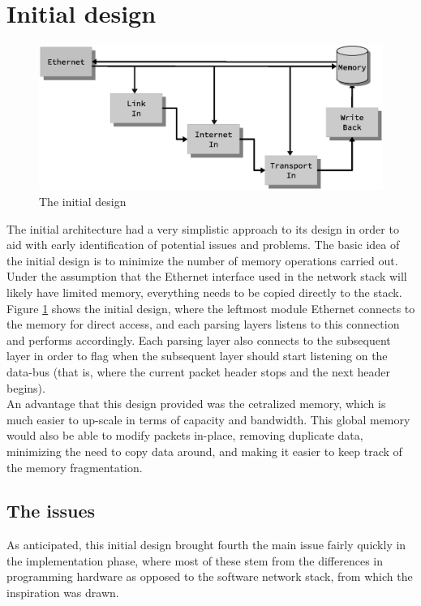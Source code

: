 \section{Initial design}

\begin{figure}
    \centering
    \includegraphics[scale=0.45]{design/design_0.eps}
    \caption{The initial design}
    \label{fig:initial_design}
\end{figure}

The initial architecture had a very simplistic approach to its design in order
to aid with early identification of potential issues and problems.
The basic idea of the initial design is to minimize the number of memory
operations carried out. Under the assumption that the Ethernet interface used in the network
stack will likely have limited memory, everything needs to be copied directly to
the stack. Figure \ref{fig:initial_design} shows the initial design, where the
leftmost module Ethernet connects to the memory for direct access, and each
parsing layers listens to this connection and performs accordingly. Each parsing
layer also connects to the subsequent layer in order to flag when the subsequent
layer should start listening on the data-bus (that is, where the current packet
header stops and the next header begins).\\
An advantage that this design provided was the cetralized memory, which is much
easier to up-scale in terms of capacity and bandwidth. This global memory would
also be able to modify packets in-place, removing duplicate data, minimizing the
need to copy data around, and making it easier to keep track of the memory
fragmentation.

\subsection{The issues}
As anticipated, this initial design brought fourth the main issue fairly quickly
in the implementation phase, where most of these stem from the differences in
programming hardware as opposed to the software network stack, from which the
inspiration was drawn.

